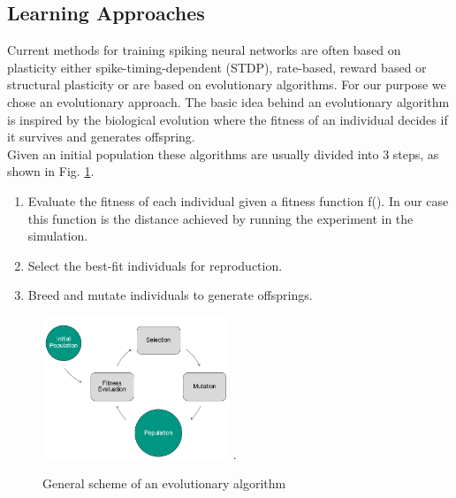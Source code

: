 \subsection{Learning Approaches}
Current methods for training spiking neural networks are often based on plasticity either spike-timing-dependent (STDP), rate-based, reward based or structural plasticity or are based on evolutionary algorithms. %
For our purpose we chose an evolutionary approach. The basic idea behind an evolutionary algorithm is inspired by the biological evolution where the fitness of an individual decides if it survives and generates offspring. \\
 Given an initial population these algorithms are usually divided into 3 steps, as shown in Fig. \ref{evo_base}. 
 \begin{enumerate}
 	\item Evaluate the fitness of each individual given a fitness function f(). In our case this function is the distance achieved by running the experiment in the simulation.
 	\item Select the best-fit individuals for reproduction.
 	\item Breed and mutate individuals to generate offsprings.
 \end{enumerate}


\begin{figure}[H]
	\centering
	\includegraphics[width=2.2in]{img/evo_base.png}
	\DeclareGraphicsExtensions.
	\caption{General scheme of an evolutionary algorithm}
	\label{evo_base}
\end{figure}

